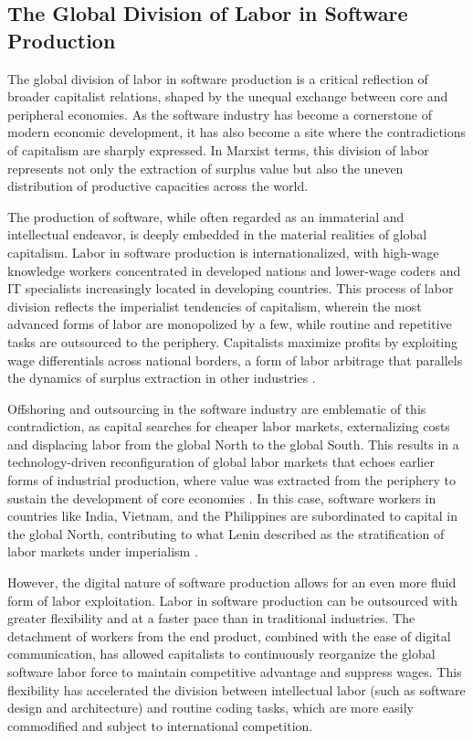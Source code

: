 \begin{refsection}
\section{The Global Division of Labor in Software Production}

The global division of labor in software production is a critical reflection of broader capitalist relations, shaped by the unequal exchange between core and peripheral economies. As the software industry has become a cornerstone of modern economic development, it has also become a site where the contradictions of capitalism are sharply expressed. In Marxist terms, this division of labor represents not only the extraction of surplus value but also the uneven distribution of productive capacities across the world.

The production of software, while often regarded as an immaterial and intellectual endeavor, is deeply embedded in the material realities of global capitalism. Labor in software production is internationalized, with high-wage knowledge workers concentrated in developed nations and lower-wage coders and IT specialists increasingly located in developing countries. This process of labor division reflects the imperialist tendencies of capitalism, wherein the most advanced forms of labor are monopolized by a few, while routine and repetitive tasks are outsourced to the periphery. Capitalists maximize profits by exploiting wage differentials across national borders, a form of labor arbitrage that parallels the dynamics of surplus extraction in other industries \cite[pp.~75-77]{harvey2001}. 

Offshoring and outsourcing in the software industry are emblematic of this contradiction, as capital searches for cheaper labor markets, externalizing costs and displacing labor from the global North to the global South. This results in a technology-driven reconfiguration of global labor markets that echoes earlier forms of industrial production, where value was extracted from the periphery to sustain the development of core economies \cite[pp.~223-225]{smith2016}. In this case, software workers in countries like India, Vietnam, and the Philippines are subordinated to capital in the global North, contributing to what Lenin described as the stratification of labor markets under imperialism \cite[pp.~81-83]{lenin1917}.

However, the digital nature of software production allows for an even more fluid form of labor exploitation. Labor in software production can be outsourced with greater flexibility and at a faster pace than in traditional industries. The detachment of workers from the end product, combined with the ease of digital communication, has allowed capitalists to continuously reorganize the global software labor force to maintain competitive advantage and suppress wages. This flexibility has accelerated the division between intellectual labor (such as software design and architecture) and routine coding tasks, which are more easily commodified and subject to international competition.


\end{refsection}
